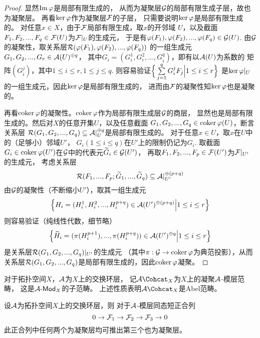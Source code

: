 \begin{proof}
显然$\operatorname{Im}\varphi$是局部有限生成的，
从而为凝聚层$\mathcal{G}$的局部有限生成子层，故也为凝聚层。
再看$\ker\varphi$作为凝聚层$\mathcal{F}$的子层，
只需要说明$\ker\varphi$是局部有限生成的。
对任意$x\in X$，由于$\mathcal{F}$局部有限生成，取$x$的开邻域
$U$，以及截面$F_1,F_2,...,F_q\in\mathcal{F}(U)$为$\mathcal{F}|_U$的生成元，
于是有$\varphi(F_1),\varphi(F_2),...,\varphi(F_q)\in\mathcal{G}(U)$.
由$\mathcal{G}$的凝聚性，取关系层$\mathcal{R}(\varphi(F_1),\varphi(F_2),...,\varphi(F_q))$
的一组生成元$G_1,G_2,...,G_r\in\mathcal{A}(U)^{\oplus q}$，
其中$G_i=(G_i^1,G_i^2,...,G_i^q)$，即有以$\mathcal{A}(U)$为系数的
矩阵$(G_i^j)$，其中$1\leq i\leq r,1\leq j\leq q$.
则容易验证$\Big\{ \sum\limits_{j=1}^qG_i^jF_j \Big| 1\leq i\leq r \Big\}$
是$\ker\varphi|_U$的一组生成元，因此$\ker\varphi$是局部有限生成的，
进而由$\mathcal{F}$的凝聚性知$\ker\varphi$也是凝聚的。

再看$\operatorname{coker}\varphi$的凝聚性。$\operatorname{coker}\varphi$作为局部有限生成层$\mathcal{G}$的商层，
显然也是局部有限生成的。然后对$X$的任意开集$U$，以及任意截面
$G_1,G_2,...,G_q\in\operatorname{coker}\varphi(U)$，断言关系层
$\mathcal{R}(G_1,G_2,...,G_q)\subseteq\mathcal{A}|_U^{\oplus q}$是局部有限生成的。
对于任意$x\in U$，取$x$在$U$中的（足够小）邻域$U'$，
$G_i(1\leq i\leq q)$在$U'$上的限制仍记为$G_i$.
取截面$G_i\in\operatorname{coker}\varphi(U')$在$\mathcal{G}$中的代表元$\widetilde{G}_i\in\mathcal{G}(U')$，
再取$F_1,F_2,...,F_p\in\mathcal{F}(U')$为$\mathcal{F}|_{U'}$的生成元，
考虑关系层
$$
  \mathcal{R}(F_1,...,F_p;\widetilde{G}_1,...,\widetilde{G}_q)
\subseteq\mathcal{A}|_{U'}^{\oplus(p+q)}
$$
由$\mathcal{G}$的凝聚性（不断缩小$U'$），取其一组生成元
$$
  \Big\{ H_i=(H_i^1,H_i^2,...,H_i^{p+q})\in\mathcal{A}(U')^{\oplus(p+q)} \Big| 1\leq i\leq r \Big\}
$$
则容易验证（纯线性代数，细节略）
$$
  \Big\{ \widetilde{H}_i=(\pi(H_i^{p+1}),...,\pi(H_i^{p+q}))\in\mathcal{A}(U')^{\oplus q} \Big| 1\leq i\leq r \Big\}
$$
是关系层$\mathcal{R}(G_1,G_2,...,G_q)|_{U'}$的生成元
（其中$\pi:\mathcal{G}\to\operatorname{coker}\varphi$为典范投影），从而
关系层$\mathcal{R}(G_1,G_2,...,G_q)$是局部有限生成的，因此$\operatorname{coker}\varphi$凝聚。
\end{proof}

\begin{rem}对于拓扑空间$X$，$\mathcal{A}$为$X$上的交换环层，
记$\mcalA\Cohcat_X$为$X$上的凝聚$\mathcal{A}$-模层范畴，
这是$\mathcal{A}\operatorname{\!\text{-}\mathsf{Mod}}_X$的子范畴。
上述性质表明$\mcalA\Cohcat_X$是Abel范畴。
\end{rem}


\begin{prop}设$\mathcal{A}$为拓扑空间$X$上的交换环层，则
对于$\mathcal{A}$-模层同态短正合列
$$
  0\to\mathcal{F}_1\to\mathcal{F}_2\to\mathcal{F}_3\to 0
$$
此正合列中任何两个为凝聚层均可推出第三个也为凝聚层。
\label{凝聚短正合列-prop}
\end{prop}

